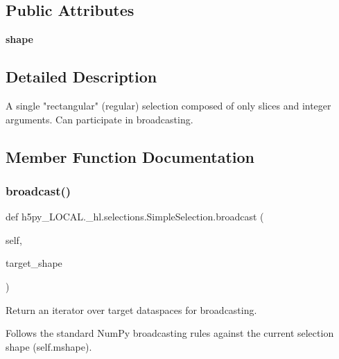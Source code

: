 \subsection*{Public Attributes}
\begin{DoxyCompactItemize}
\item 
\mbox{\label{classh5py__LOCAL_1_1__hl_1_1selections_1_1SimpleSelection_a709f8d805febfdbbbf68b2cc57644472}} 
{\bfseries shape}
\end{DoxyCompactItemize}


\subsection{Detailed Description}
\begin{DoxyVerb}A single "rectangular" (regular) selection composed of only slices
    and integer arguments.  Can participate in broadcasting.
\end{DoxyVerb}
 

\subsection{Member Function Documentation}
\mbox{\label{classh5py__LOCAL_1_1__hl_1_1selections_1_1SimpleSelection_a1bf3c175664ee8570535c49b9903d710}} 
\subsubsection{\texorpdfstring{broadcast()}{broadcast()}}
{\footnotesize\ttfamily def h5py\+\_\+\+L\+O\+C\+A\+L.\+\_\+hl.\+selections.\+Simple\+Selection.\+broadcast (\begin{DoxyParamCaption}\item[{}]{self,  }\item[{}]{target\+\_\+shape }\end{DoxyParamCaption})}

\begin{DoxyVerb}Return an iterator over target dataspaces for broadcasting.

Follows the standard NumPy broadcasting rules against the current
selection shape (self.mshape).
\end{DoxyVerb}
 \mbox{\label{classh5py__LOCAL_1_1__hl_1_1selections_1_1SimpleSelection_a54f6ea828be0dfc9651fd22cd5ddda32}} 
